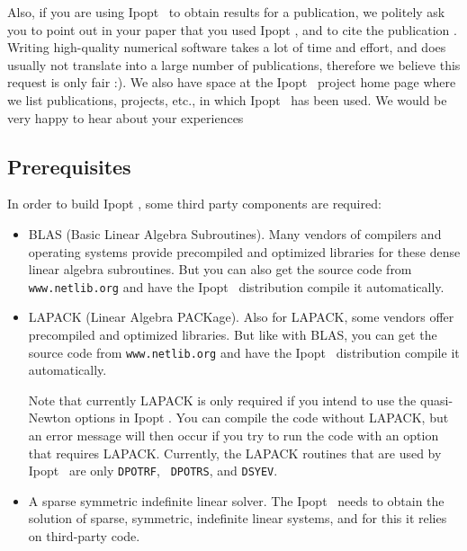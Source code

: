 \documentclass[10pt]{article}
\newcommand{\Ipopt}{{\sc Ipopt }}
\begin{document}
Also, if you are using \Ipopt\ to obtain results for a publication, we
politely ask you to point out in your paper that you used \Ipopt, and
to cite the publication \cite{WaecBieg06:mp}.  Writing high-quality
numerical software takes a lot of time and effort, and does usually
not translate into a large number of publications, therefore we
believe this request is only fair :).  We also have space at the
\Ipopt\ project home page where we list publications, projects, etc.,
in which \Ipopt\ has been used.  We would be very happy to hear about
your experiences

\subsection{Prerequisites}
In order to build \Ipopt, some third party components are required:
\begin{itemize}
\item BLAS (Basic Linear Algebra Subroutines).  Many vendors of
  compilers and operating systems provide precompiled and optimized
  libraries for these dense linear algebra subroutines.  But you can
  also get the source code from {\tt www.netlib.org} and have the
  \Ipopt\ distribution compile it automatically.
\item LAPACK (Linear Algebra PACKage).  Also for LAPACK, some vendors
  offer precompiled and optimized libraries.  But like with BLAS, you
  can get the source code from {\tt www.netlib.org} and have the
  \Ipopt\ distribution compile it automatically.

  Note that currently LAPACK is only required if you intend to use the
  quasi-Newton options in \Ipopt.  You can compile the code without
  LAPACK, but an error message will then occur if you try to run the
  code with an option that requires LAPACK.  Currently, the LAPACK
  routines that are used by \Ipopt\ are only {\tt DPOTRF}, {\tt
    DPOTRS}, and {\tt DSYEV}.
\item A sparse symmetric indefinite linear solver. The \Ipopt\ needs
  to obtain the solution of sparse, symmetric, indefinite linear
  systems, and for this it relies on third-party code.  


\end{itemize}
\end{document}
